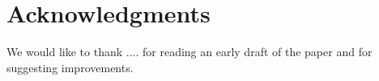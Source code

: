 \section{Acknowledgments}

We would like to thank .... for reading
an early draft of the paper and for suggesting improvements.
